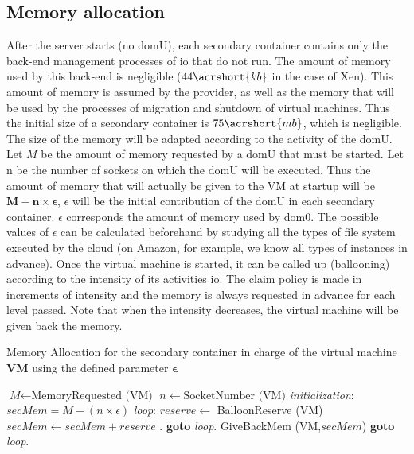 \subsection{Memory allocation}
After the server starts (no domU), each secondary container contains only the back-end management processes of \acrshort{io} that do not run. The amount of memory used by this back-end is negligible ($44\acrshort{kb}$ in the case of Xen). This amount of memory is assumed by the provider, as well as the memory that will be used by the processes of migration and shutdown of virtual machines. Thus the initial size of a secondary container is $75\acrshort{mb}$, which is negligible. The size of the memory will be adapted according to the activity of the domU. Let $M$ be the amount of memory requested by a domU that must be started. Let n be the number of sockets on which the domU will be executed. Thus the amount of memory that will actually be given to the VM at startup will be $\mathbf{M-n\times\epsilon}$, $\epsilon$ will be the initial contribution of the domU in each secondary container. $\epsilon$ corresponds the amount of memory used by dom0. The possible values of $\epsilon$ can be calculated beforehand by studying all the types of file system executed by the cloud (on Amazon, for example, we know all types of instances in advance). Once the virtual machine is started, it can be called up (ballooning) according to the intensity of its activities \acrshort{io}. The claim policy is made in increments of intensity and the memory is always requested in advance for each level passed. Note that when the intensity decreases, the virtual machine will be given back the memory.


\begin{algorithm}
\caption{Memory Allocation for the secondary container in charge of the virtual machine \textbf{VM} using the defined parameter $\mathbf{\epsilon}$}
\begin{algorithmic}[1]
\State $\textit{M} \gets \text{MemoryRequested (VM)}$ 
\State $n \gets \text{SocketNumber (VM)}$ 
\BState \emph{initialization}:
\State $secMem = M - (n\times\epsilon)$
\BState \emph{loop}:
 
\State $reserve \gets $ BalloonReserve (VM) 
\State $secMem \gets secMem + reserve $ . 
\State \textbf{goto} \emph{loop}.
\Else 
        \State GiveBackMem (VM,$secMem$)
    \EndIf
\State \textbf{goto} \emph{loop}.
\EndIf
\EndProcedure
\end{algorithmic}
\end{algorithm}

